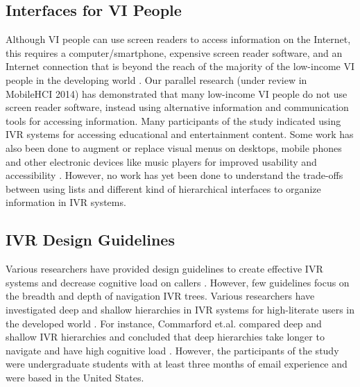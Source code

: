 \documentclass{sigchi}
\begin{document}
\subsection{Interfaces for VI People}
Although VI people can use screen readers to access information on the Internet, this requires a computer/smartphone, expensive screen reader software, and an Internet connection that is beyond the reach of the majority of the low-income VI people in the developing world \cite{McCarthy2012}. Our parallel research (under review in MobileHCI 2014) has demonstrated that many low-income VI people do not use screen reader software, instead using alternative information and communication tools for accessing information. Many participants of the study indicated using IVR systems for accessing educational and entertainment content. Some work has also been done to augment or replace visual menus on desktops, mobile phones and other electronic devices like music players for improved usability and accessibility \cite{Yalla2008,Zhao2007,Jeon2012}. However, no work has yet been done to understand the trade-offs between using lists and different kind of hierarchical interfaces to organize information in IVR systems.

\subsection{IVR Design Guidelines}
Various researchers have provided design guidelines to create effective IVR systems and decrease cognitive load on callers	 \cite{Ndwe2008,Suhm2008,MSDNSpeech,Halstead-Nussloch1989}. However, few guidelines focus on the breadth and depth of navigation IVR trees. Various researchers have investigated deep and shallow hierarchies in IVR systems for high-literate users in the developed world \cite{Huguenard1997,Virzi1997,Commarford2008}. For instance, Commarford et.al. compared deep and shallow IVR hierarchies and concluded that deep hierarchies take longer to navigate and have high cognitive load \cite{Commarford2008}. However, the participants of the study were undergraduate students with at least three months of email experience and were based in the United States. 
\end{document}
